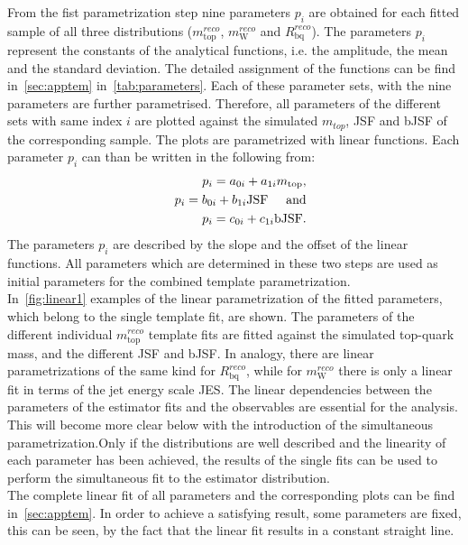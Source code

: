 {{\noindent From the fist parametrization step nine parameters $p_i$ are obtained for each fitted sample of all three distributions ($m_{\text{top}}^{reco}$, $m_{\text{W}}^{reco}$ and $R_{\text{bq}}^{reco}$). The  parameters $p_i$ represent the constants of the analytical functions, i.e. the amplitude, the mean and the standard deviation. The detailed assignment of the functions can be find in~\cref{sec:apptem} in~\cref{tab:parameters}. Each of these parameter sets, with the nine parameters are further parametrised. Therefore, all parameters of the different sets with same index $i$  are plotted against the simulated $m_{top}$, JSF and bJSF of the corresponding sample. The plots are parametrized with linear functions.  Each parameter $p_i$ can than be written in the following from:
\begin{eqnarray}
&&p_i = a_{0i} + a_{1i} m_{\text{top}}, \nonumber \\  
&& p_i = b_{0i} + b_{1i}\text{JSF}      \hspace{0.5cm}     \text{and}      \nonumber \\   
&& p_i = c_{0i} + c_{1i}\text{bJSF}.     
\end{eqnarray}
The parameters $p_i$ are described by the slope and the offset of the linear functions. All parameters which are determined in these two steps  are used  as initial parameters  for the combined template parametrization.\\

\noindent In~\cref{fig:linear1} examples of the linear parametrization of the fitted parameters, which belong to the single template fit, are shown. The parameters of the different individual $m_{\text{top}}^{reco}$ template fits are fitted against the simulated top-quark mass, and the different JSF and bJSF.  In analogy, there are linear parametrizations of the same kind for  $R_{\text{bq}}^{reco}$, while for $m_{\text{W}}^{reco}$ there is only a linear fit in terms of the jet energy scale JES. The linear dependencies between the parameters of the estimator fits and the observables are essential for the analysis. This will become more clear below with the introduction of the simultaneous parametrization.Only if the distributions are well described and the linearity of each parameter has been achieved, the results of the single fits can be used to perform the simultaneous fit to the estimator distribution.\\ 

\noindent The complete linear fit of all  parameters and the corresponding plots can be find in~\cref{sec:apptem}. In order to achieve a satisfying result, some parameters are fixed, this can be seen, by the fact that the linear fit results in a constant straight line.\\




}}
